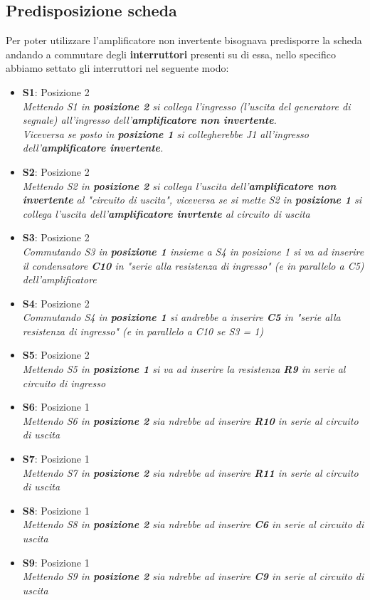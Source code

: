 \documentclass{article}
\begin{document}
\subsection{Predisposizione scheda}
Per poter utilizzare l'amplificatore non invertente bisognava predisporre la scheda andando a commutare degli \textbf{interruttori} presenti su di essa, nello specifico abbiamo settato gli interruttori nel seguente modo:
\begin{itemize}
	\item \textbf{S1}: Posizione 2\\ \textit{Mettendo S1 in \textbf{posizione 2} si collega l'ingresso (l'uscita del generatore di segnale) all'ingresso dell'\textbf{amplificatore non invertente}.\\Viceversa se posto in \textbf{posizione 1} si collegherebbe J1 all'ingresso dell'\textbf{amplificatore invertente}.}
	\item \textbf{S2}: Posizione 2\\ \textit{Mettendo S2 in \textbf{posizione 2} si collega l'uscita dell'\textbf{amplificatore non invertente} al "circuito di uscita", viceversa se si mette S2 in \textbf{posizione 1} si collega l'uscita dell'\textbf{amplificatore invrtente} al circuito di uscita}
	\item \textbf{S3}: Posizione 2\\ \textit{Commutando S3 in \textbf{posizione 1} insieme a S4 in posizione 1 si va ad inserire il condensatore \textbf{C10} in "serie alla resistenza di ingresso" (e in parallelo a C5) dell'amplificatore}
	\item \textbf{S4}: Posizione 2\\ \textit{Commutando S4 in \textbf{posizione 1} si andrebbe a inserire \textbf{C5} in "serie alla resistenza di ingresso" (e in parallelo a C10 se S3 = 1)}
	\item \textbf{S5}: Posizione 2\\\textit{Mettendo S5 in \textbf{posizione 1} si va ad inserire la resistenza \textbf{R9} in serie al circuito di ingresso}
	\item \textbf{S6}: Posizione 1\\ \textit{Mettendo S6 in \textbf{posizione 2} sia ndrebbe ad inserire \textbf{R10} in serie al circuito di uscita}
	\item \textbf{S7}: Posizione 1\\ \textit{Mettendo S7 in \textbf{posizione 2} sia ndrebbe ad inserire \textbf{R11} in serie al circuito di uscita}
	\item \textbf{S8}: Posizione 1\\ \textit{Mettendo S8 in \textbf{posizione 2} sia ndrebbe ad inserire \textbf{C6} in serie al circuito di uscita}
	\item \textbf{S9}: Posizione 1\\ \textit{Mettendo S9 in \textbf{posizione 2} sia ndrebbe ad inserire \textbf{C9} in serie al circuito di uscita}
\end{itemize}
\end{document}
